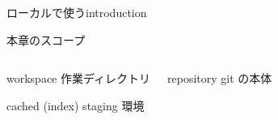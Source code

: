 
\begin{frame}[t]{ローカルで使う}{introduction}

  本章のスコープ
  \vspace{4ex}

  \begin{columns}

    \begin{narrowcolumn}
      \begin{block}{workspace}
        作業ディレクトリ
      \end{block}

      \begin{block}{cached (index)}
        staging 環境
      \end{block}
    \end{narrowcolumn}

    \begin{halfcolumn}
      \begin{block}{repository}
        git の本体
      \end{block}
    \end{halfcolumn}

  \end{columns}

\end{frame}

